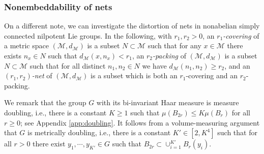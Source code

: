 \documentclass[11pt,reqno]{amsart}
\newcommand{\1}{\mathbf 1}
\begin{document}
\subsubsection{Nonembeddability of nets}\label{subsubsec:net}

On a different note, we can investigate the distortion of nets in nonabelian simply connected nilpotent Lie groups. In the following, with $r_1,r_2>0$, an \emph{$r_1$-covering} of a metric space $\left(\mathcal{M},d_\mathcal{M}\right)$ is a subset $N\subset \mathcal{M}$ such that for any $x\in \mathcal{M}$ there exists $n_x\in N$ such that $d_\mathcal{M}\left(x,n_x\right)<r_1$, an \emph{$r_2$-packing} of $\left(\mathcal{M},d_\mathcal{M}\right)$ is a subset $N\subset \mathcal{M}$ such that for all distinct $n_1,n_2\in N$ we have $d_\mathcal{M}\left(n_1,n_2\right)\ge r_2$, and an \emph{$\left(r_1,r_2\right)$-net} of $\left(\mathcal{M},d_\mathcal{M}\right)$ is a subset which is both an $r_1$-covering and an $r_2$-packing.

We remark that the group $G$ with its bi-invariant Haar measure is measure doubling, i.e., there is a constant $K\ge 1$ such that $\mu\left(B_{2r}\right)\le K \mu\left(B_r\right)$ for all $r\ge 0$; see Appendix \ref{app:doubling}. %
It follows from a volume-measuring argument that $G$ is metrically doubling, i.e., there is a constant $K'\in \left[2,K^4\right]$ such that for all $r>0$ there exist $y_1,\cdots,y_{K'}\in G$ such that $B_{2r}\subset \cup_{i=1}^{K'} B_r\left(y_i\right)$.
\end{document}
